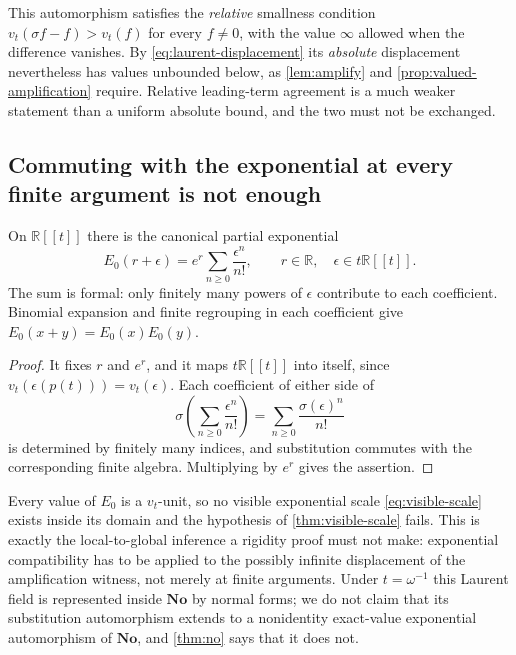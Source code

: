 \documentclass[11pt]{article}
\newtheorem{proposition}[theorem]{Proposition}
\theoremstyle{definition}
\theoremstyle{remark}
\newcommand{\No}{\mathbf{No}}
\newcommand{\R}{\mathbb{R}}
\numberwithin{equation}{section}
\begin{document}
This automorphism satisfies the \emph{relative} smallness condition
$v_t(\sigma f-f)>v_t(f)$ for every $f\ne0$, with the value $\infty$ allowed
when the difference vanishes. By \eqref{eq:laurent-displacement} its
\emph{absolute} displacement nevertheless has values unbounded below, as
\cref{lem:amplify} and \cref{prop:valued-amplification} require. Relative
leading-term agreement is a much weaker statement than a uniform absolute
bound, and the two must not be exchanged.

\subsection{Commuting with the exponential at every finite argument is not enough}

On $\R[[t]]$ there is the canonical partial exponential
\begin{equation}\label{eq:partial-exp}
 E_0(r+\epsilon)=e^{r}\sum_{n\ge0}\frac{\epsilon^{n}}{n!},
 \qquad r\in\R,\quad\epsilon\in t\R[[t]] .
\end{equation}
The sum is formal: only finitely many powers of $\epsilon$ contribute to
each coefficient. Binomial expansion and finite regrouping in each
coefficient give $E_0(x+y)=E_0(x)E_0(y)$.

\begin{proof}
It fixes $r$ and $e^{r}$, and it maps $t\R[[t]]$ into itself, since
$v_t(\epsilon(p(t)))=v_t(\epsilon)$. Each coefficient of either side of
\[
 \sigma\!\left(\sum_{n\ge0}\frac{\epsilon^{n}}{n!}\right)
 =\sum_{n\ge0}\frac{\sigma(\epsilon)^{n}}{n!}
\]
is determined by finitely many indices, and substitution commutes with the
corresponding finite algebra. Multiplying by $e^{r}$ gives the assertion.
\end{proof}

Every value of $E_0$ is a $v_t$-unit, so no visible exponential scale
\eqref{eq:visible-scale} exists inside its domain and the hypothesis of
\cref{thm:visible-scale} fails. This is exactly the local-to-global
inference a rigidity proof must not make: exponential compatibility has to
be applied to the possibly infinite displacement of the amplification
witness, not merely at finite arguments. Under $t=\omega^{-1}$ this Laurent
field is represented inside $\No$ by normal forms; we do not claim that its
substitution automorphism extends to a nonidentity exact-value exponential
automorphism of $\No$, and \cref{thm:no} says that it does not.
\end{document}
